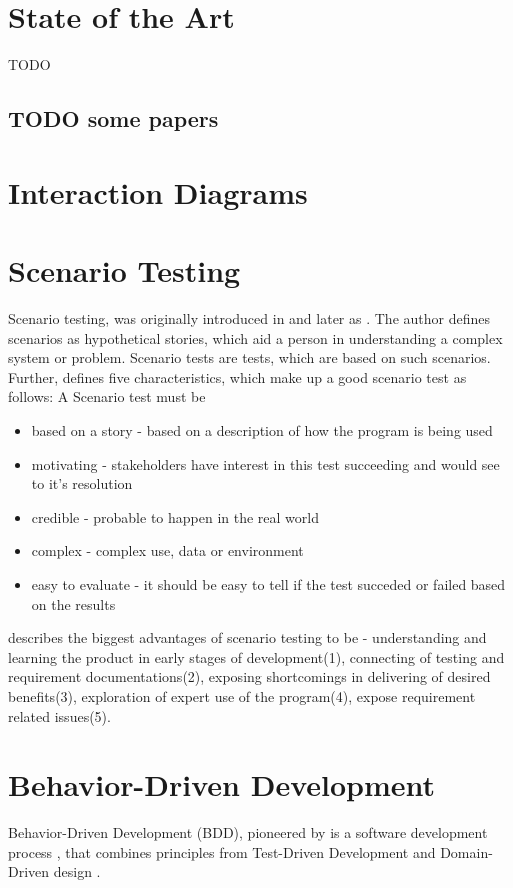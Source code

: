 \section{State of the Art}
TODO
\subsection{TODO some papers}

\section{Interaction Diagrams}
\section{Scenario Testing}
Scenario testing, was originally introduced in \textcite{kaner2003power} and later as \textcite{kaner2013introduction}. The author defines scenarios as hypothetical stories, which aid a person in understanding a complex system or problem. Scenario tests are tests, which are based on such scenarios.  \parencite[1]{kaner2013introduction}
Further, \parencite[2-5]{kaner2003power} defines five characteristics, which make up a good scenario test as follows:
A Scenario test must be
\begin{itemize}
     \item based on a story - based on a description of how the program is being used
    \item motivating - stakeholders have interest in this test succeeding and would see to it's resolution
    \item credible - probable to happen in the real world
    \item complex - complex use, data or environment
    \item easy to evaluate - it should be easy to tell if the test succeded or failed based on the results 
\end{itemize}

\textcite{kaner2013introduction} describes the biggest advantages of scenario testing to be  - understanding and learning the product in early stages of development(1), connecting of testing and requirement documentations(2), exposing shortcomings in delivering of desired benefits(3), exploration of expert use of the program(4), expose requirement related issues(5).

\section{Behavior-Driven Development}
Behavior-Driven Development (BDD), pioneered by  \textcite{north2006behavior} is a software development
process , that combines principles from Test-Driven Development and Domain-Driven design \parencite{evans2004domain}.

